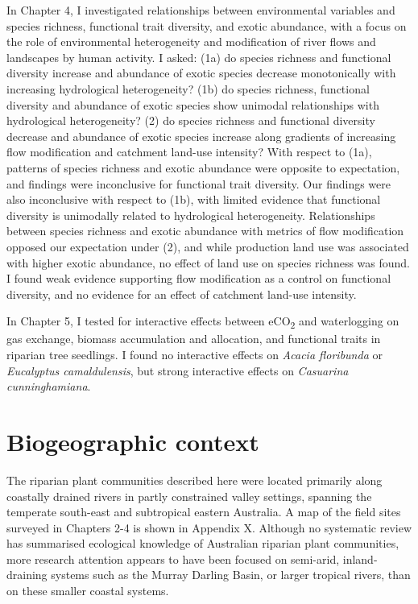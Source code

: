 In Chapter 4, I investigated relationships between environmental variables and species richness, functional trait diversity, and exotic abundance, with a focus on the role of environmental heterogeneity and modification of river flows and landscapes by human activity. I asked: (1a) do species richness and functional diversity increase and abundance of exotic species decrease monotonically with increasing hydrological heterogeneity? (1b) do species richness, functional diversity and abundance of exotic species show unimodal relationships with hydrological heterogeneity? (2) do species richness and functional diversity decrease and abundance of exotic species increase along gradients of increasing flow modification and catchment land-use intensity? With respect to (1a), patterns of species richness and exotic abundance were opposite to expectation, and findings were inconclusive for functional trait diversity. Our findings were also inconclusive with respect to (1b), with limited evidence that functional diversity is unimodally related to hydrological heterogeneity. Relationships between species richness and exotic abundance with metrics of flow modification opposed our expectation under (2), and while production land use was associated with higher exotic abundance, no effect of land use on species richness was found. I found weak evidence supporting flow modification as a control on functional diversity, and no evidence for an effect of catchment land-use intensity.

In Chapter 5, I tested for interactive effects between eCO\textsubscript{2} and waterlogging on gas exchange, biomass accumulation and allocation, and functional traits in riparian tree seedlings. I found no interactive effects on \textit{Acacia floribunda} or \textit{Eucalyptus camaldulensis}, but strong interactive effects on \textit{Casuarina cunninghamiana}.

\section{Biogeographic context}
The riparian plant communities described here were located primarily along coastally drained rivers in partly constrained valley settings, spanning the temperate south-east and subtropical eastern Australia. A map of the field sites surveyed in Chapters 2-4 is shown in Appendix X. Although no systematic review has summarised ecological knowledge of Australian riparian plant communities, more research attention appears to have been focused on semi-arid, inland-draining systems such as the Murray Darling Basin, or larger tropical rivers, than on these smaller coastal systems.

